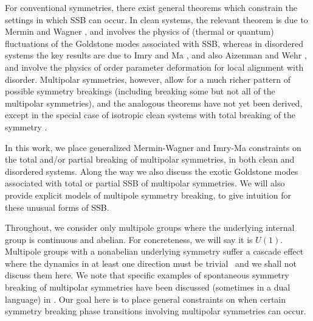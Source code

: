 \documentclass[pra,aps,twocolumn, amsfonts,amsmath,amssymb,nofootinbib,superscriptaddress]{revtex4-2}
\begin{document}
For conventional symmetries, there exist general theorems which constrain the settings in which SSB can occur. In clean systems, the relevant theorem is due to Mermin and Wagner \cite{MerminWagner}, and involves the physics of (thermal or quantum) fluctuations of the Goldstone modes associated with SSB, whereas in disordered systems the key results are due to Imry and Ma \cite{ImryMa, Vojta2013}, and also Aizenman and Wehr \cite{Aizenman}, and involve the physics of order parameter deformation for local alignment with disorder. Multipolar symmetries, however, allow for a much richer pattern of possible symmetry breakings (including breaking some but not all of the multipolar symmetries), and the analogous theorems have not yet been derived, except in the special case of isotropic clean systems with total breaking of the symmetry \cite{Griffin2013Multi}.

In this work, we place generalized Mermin-Wagner and Imry-Ma constraints on the total and/or partial breaking of multipolar symmetries, in both clean and disordered systems. Along the way we also discuss the exotic Goldstone modes associated with total or partial SSB of multipolar symmetries. We will also provide explicit models of multipole symmetry breaking, to give intuition for these unusual forms of SSB. 

Throughout, we consider only multipole groups where the underlying internal group is continuous and abelian. For concreteness, we will say it is $U(1)$. Multipole groups with a nonabelian underlying symmetry suffer a cascade effect where the dynamics in at least one direction must be trivial~\cite{nonabelian} and we shall not discuss them here. We note that specific examples of spontaneous symmetry breaking of multipolar symmetries have been discussed (sometimes in a dual language) in \cite{elastic1, elastic2, elastic3, elastic4, elastic5, FS1, FS2}. Our goal here is to place general constraints on when certain symmetry breaking phase transitions involving multipolar symmetries can occur. 
\end{document}
